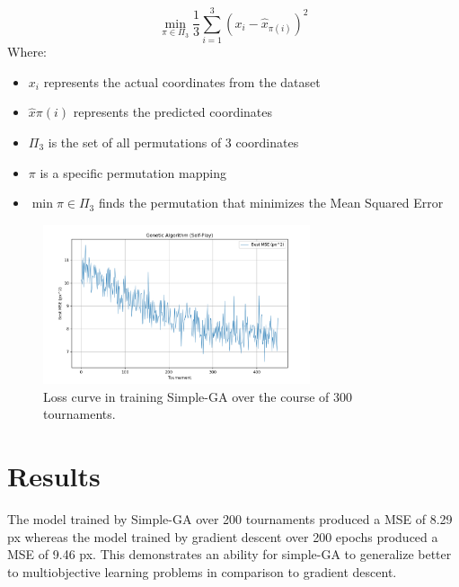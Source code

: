 \documentclass{article}
\begin{document}
\begin{equation}
\min_{\pi \in \Pi_3} \frac{1}{3} \sum_{i=1}^{3} \left(x_{i} - \hat{x}_{\pi(i)}\right)^{2}\label{eq:loss_calc}
\end{equation}
Where:
\begin{itemize}
\item $x_{i}$ represents the actual coordinates from the dataset
\item $\hat{x}{\pi(i)}$ represents the predicted coordinates
\item $\Pi_3$ is the set of all permutations of 3 coordinates
\item $\pi$ is a specific permutation mapping
\item $\min{\pi \in \Pi_3}$ finds the permutation that minimizes the Mean Squared Error
\end{itemize}

\begin{figure}[!ht]
\centering
\includegraphics[width=0.7\textwidth]{ga-loss.png}
\caption{Loss curve in training Simple-GA over the course of 300 tournaments. }
\end{figure}

\section{Results}

The model trained by Simple-GA over 200 tournaments produced a MSE of 8.29 px whereas the model trained by gradient descent over 200 epochs produced a MSE of 9.46 px. This demonstrates an ability for simple-GA to generalize better to multiobjective learning problems in comparison to gradient descent.
\end{document}
